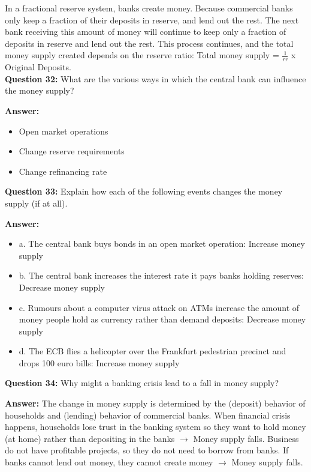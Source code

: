 \documentclass[a4paper, 11pt]{article}
\begin{document}
In a fractional reserve system, banks create money. Because commercial banks only keep a fraction of their deposits in reserve, and lend out the rest. The next bank receiving this amount of money will continue to keep only a fraction of deposits in reserve and lend out the rest. This process continues, and the total money supply created depends on the reserve ratio: Total money supply = $\frac{1}{rr}$ x Original Deposits. \\

\textbf{Question 32:} What are the various ways in which the central bank can influence the money supply?

\textbf{Answer:} 
\begin{itemize}
\item Open market operations
\item Change reserve requirements
\item Change refinancing rate
\end{itemize}

\textbf{Question 33:} Explain how each of the following events changes the money supply (if at all).

\textbf{Answer:} 

\begin{itemize}
\item a. The central bank buys bonds in an open market operation: Increase money supply
\item b. The central bank increases the interest rate it pays banks holding reserves: Decrease money supply
\item c. Rumours about a computer virus attack on ATMs increase the amount of money people hold as currency rather than demand deposits: Decrease money supply
\item d. The ECB flies a helicopter over the Frankfurt pedestrian precinct and drops 100 euro bills: Increase money supply
\end{itemize}

\textbf{Question 34:} Why might a banking crisis lead to a fall in money supply?

\textbf{Answer:} 
The change in money supply is determined by the (deposit) behavior of households and (lending) behavior of commercial banks. When financial crisis happens, households lose trust in the banking system so they want to hold money (at home) rather than depositing in the banks $\rightarrow$ Money supply falls. Business do not have profitable projects, so they do not need to borrow from banks. If banks cannot lend out money, they cannot create money $\rightarrow$ Money supply falls.
\end{document}
